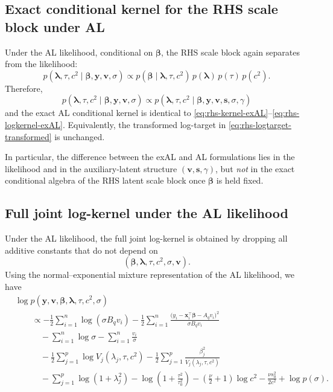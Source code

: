 \documentclass[11pt]{article}
\newcommand{\vect}[1]{\boldsymbol{#1}}
\begin{document}
\subsection{Exact conditional kernel for the RHS scale block under AL}

Under the AL likelihood, conditional on $\vect{\beta}$, the RHS scale block again separates
from the likelihood:
\begin{equation}
  p(\vect{\lambda},\tau,c^2 \mid \vect{\beta},\vect{y},\vect{v},\sigma)
  \propto
  p(\vect{\beta}\mid \vect{\lambda},\tau,c^2)\,
  p(\vect{\lambda})\,p(\tau)\,p(c^2).
\end{equation}
Therefore,
\begin{equation}
  p(\vect{\lambda},\tau,c^2 \mid \vect{\beta},\vect{y},\vect{v},\sigma)
  \propto
  p(\vect{\lambda},\tau,c^2 \mid \vect{\beta},\vect{y},\vect{v},\vect{s},\sigma,\gamma)
\end{equation}
and the exact AL conditional kernel is identical to
\eqref{eq:rhs-kernel-exAL}--\eqref{eq:rhs-logkernel-exAL}. Equivalently, the transformed
log-target in \eqref{eq:rhs-logtarget-transformed} is unchanged.

In particular, the difference between the exAL and AL formulations lies in the likelihood
and in the auxiliary-latent structure $(\vect{v},\vect{s},\gamma)$, but \emph{not} in the
exact conditional algebra of the RHS latent scale block once $\vect{\beta}$ is held fixed.

\subsection{Full joint log-kernel under the AL likelihood}

Under the AL likelihood, the full joint log-kernel is obtained by dropping all additive
constants that do not depend on
\[
  (\vect{\beta},\vect{\lambda},\tau,c^2,\sigma,\vect{v}).
\]
Using the normal--exponential mixture representation of the AL likelihood, we have
\begin{align}
  &\log p(\vect{y},\vect{v},\vect{\beta},\vect{\lambda},\tau,c^2,\sigma)
  \nonumber\\
  &\qquad\propto
  -\frac{1}{2}\sum_{i=1}^n \log(\sigma B_q v_i)
  -\frac{1}{2}\sum_{i=1}^n
  \frac{
    \big(
      y_i-\vect{x}_i^\top\vect{\beta}-A_q v_i
    \big)^2
  }{
    \sigma B_q v_i
  }
  \nonumber\\
  &\qquad\quad
  -\sum_{i=1}^n \log \sigma
  -\sum_{i=1}^n \frac{v_i}{\sigma}
  \nonumber\\
  &\qquad\quad
  -\frac{1}{2}\sum_{j=1}^p \log V_j(\lambda_j,\tau,c^2)
  -\frac{1}{2}\sum_{j=1}^p \frac{\beta_j^2}{V_j(\lambda_j,\tau,c^2)}
  \nonumber\\
  &\qquad\quad
  -\sum_{j=1}^p \log(1+\lambda_j^2)
  -\log\!\left(1+\frac{\tau^2}{\tau_0^2}\right)
  -\left(\frac{\nu}{2}+1\right)\log c^2
  -\frac{\nu s_0^2}{2c^2}
  + \log p(\sigma).
  \label{eq:log-kernel-full-joint-AL}
\end{align}
\end{document}
